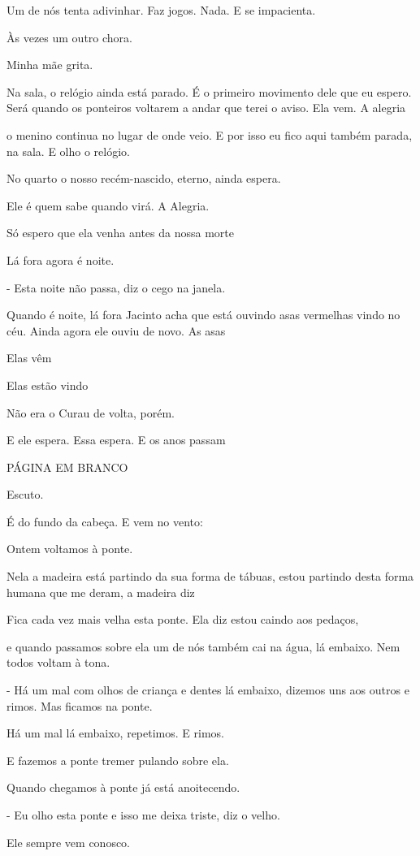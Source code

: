 Um de nós tenta adivinhar. Faz jogos. Nada. E se impacienta.

Às vezes um outro chora.

Minha mãe grita.

Na sala, o relógio ainda está parado. É o primeiro movimento dele que eu
espero. Será quando os ponteiros voltarem a andar que terei o aviso. Ela
vem. A alegria

o menino continua no lugar de onde veio. E por isso eu fico aqui também
parada, na sala. E olho o relógio.

No quarto o nosso recém-nascido, eterno, ainda espera.

Ele é quem sabe quando virá. A Alegria.

Só espero que ela venha antes da nossa morte

Lá fora agora é noite.

- Esta noite não passa, diz o cego na janela.

Quando é noite, lá fora Jacinto acha que está ouvindo asas vermelhas
vindo no céu. Ainda agora ele ouviu de novo. As asas

Elas vêm

Elas estão vindo

Não era o Curau de volta, porém.

E ele espera. Essa espera. E os anos passam

PÁGINA EM BRANCO

Escuto.

É do fundo da cabeça. E vem no vento:

Ontem voltamos à ponte.

Nela a madeira está partindo da sua forma de tábuas, estou partindo
desta forma humana que me deram, a madeira diz

Fica cada vez mais velha esta ponte. Ela diz estou caindo aos pedaços,

e quando passamos sobre ela um de nós também cai na água, lá embaixo.
Nem todos voltam à tona.

- Há um mal com olhos de criança e dentes lá embaixo, dizemos uns aos
outros e rimos. Mas ficamos na ponte.

Há um mal lá embaixo, repetimos. E rimos.

E fazemos a ponte tremer pulando sobre ela.

Quando chegamos à ponte já está anoitecendo.

- Eu olho esta ponte e isso me deixa triste, diz o velho.

Ele sempre vem conosco.

